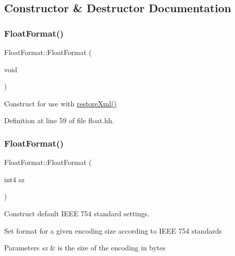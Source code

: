 \subsection{Constructor \& Destructor Documentation}
\mbox{\label{class_float_format_aac151782bc5f16b0854ea3da1feec4a9}} 
\subsubsection{\texorpdfstring{FloatFormat()}{FloatFormat()}\hspace{0.1cm}{\footnotesize\ttfamily [1/2]}}
{\footnotesize\ttfamily Float\+Format\+::\+Float\+Format (\begin{DoxyParamCaption}\item[{void}]{ }\end{DoxyParamCaption})\hspace{0.3cm}{\ttfamily [inline]}}



Construct for use with \mbox{\hyperlink{class_float_format_aa6e0b189a1a66251b200fcf829d98356}{restore\+Xml()}} 



Definition at line 59 of file float.\+hh.

\mbox{\label{class_float_format_a0c5efdce272fb2a9b63f05affedbb74a}} 
\subsubsection{\texorpdfstring{FloatFormat()}{FloatFormat()}\hspace{0.1cm}{\footnotesize\ttfamily [2/2]}}
{\footnotesize\ttfamily Float\+Format\+::\+Float\+Format (\begin{DoxyParamCaption}\item[{int4}]{sz }\end{DoxyParamCaption})}



Construct default I\+E\+EE 754 standard settings. 

Set format for a given encoding size according to I\+E\+EE 754 standards 
\begin{DoxyParams}{Parameters}
{\em sz} & is the size of the encoding in bytes \\
\hline
\end{DoxyParams}



